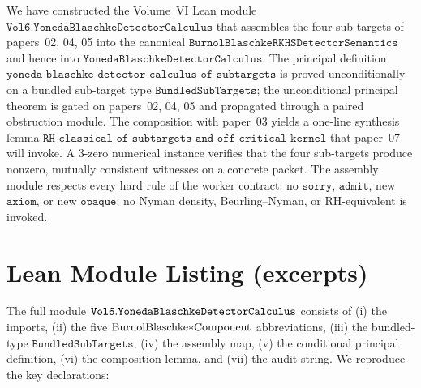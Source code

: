 \documentclass[12pt]{article}
\theoremstyle{plain}
\theoremstyle{definition}
\theoremstyle{remark}
\begin{document}
We have constructed the Volume~VI Lean module
\(\mathtt{Vol6.YonedaBlaschkeDetectorCalculus}\) that assembles the
four sub-targets of papers~02, 04, 05 into the canonical
\(\mathtt{BurnolBlaschkeRKHSDetectorSemantics}\) and hence into
\(\mathtt{YonedaBlaschkeDetectorCalculus}\). The principal definition
\(\mathtt{yoneda\_blaschke\_detector\_calculus\_of\_subtargets}\) is
proved unconditionally on a bundled sub-target type
\(\mathtt{BundledSubTargets}\); the unconditional principal theorem is
gated on papers~02, 04, 05 and propagated through a paired obstruction
module. The composition with paper~03 yields a one-line synthesis
lemma \(\mathtt{RH\_classical\_of\_subtargets\_and\_off\_critical\_kernel}\)
that paper~07 will invoke. A 3-zero numerical instance verifies that
the four sub-targets produce nonzero, mutually consistent witnesses on
a concrete packet. The assembly module respects every hard rule of the
worker contract: no \(\mathtt{sorry}\), \(\mathtt{admit}\), new
\(\mathtt{axiom}\), or new \(\mathtt{opaque}\); no Nyman density,
Beurling--Nyman, or RH-equivalent is invoked.

\appendix

\section{Lean Module Listing (excerpts)}
\label{app:lean-listing}

The full module \(\mathtt{Vol6.Yoneda\-Blaschke\-Detector\-Calculus}\)
consists of (i) the imports, (ii) the five
\(\mathrm{Burnol\-Blaschke\-{*}\-Component}\) abbreviations,
(iii) the bundled-type \(\mathtt{BundledSubTargets}\),
(iv) the assembly map, (v) the conditional principal definition,
(vi) the composition lemma, and (vii) the audit string. We reproduce
the key declarations:
\end{document}

